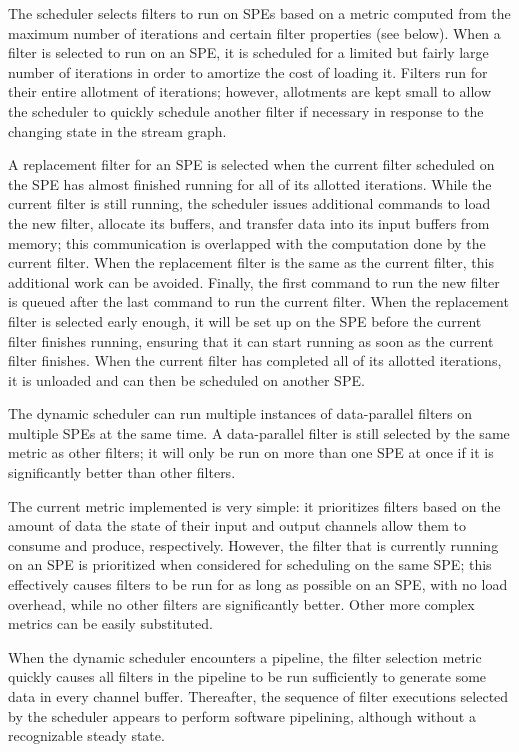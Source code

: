 The scheduler selects filters to run on SPEs based on a metric
computed from the maximum number of iterations and certain filter
properties (see below). When a filter is selected to run on an SPE, it
is scheduled for a limited but fairly large number of iterations in
order to amortize the cost of loading it. Filters run for their entire
allotment of iterations; however, allotments are kept small to allow
the scheduler to quickly schedule another filter if necessary in
response to the changing state in the stream graph.

A replacement filter for an SPE is selected when the current filter
scheduled on the SPE has almost finished running for all of its
allotted iterations. While the current filter is still running, the
scheduler issues additional commands to load the new filter, allocate
its buffers, and transfer data into its input buffers from memory;
this communication is overlapped with the computation done by the
current filter. When the replacement filter is the same as the current
filter, this additional work can be avoided. Finally, the first
command to run the new filter is queued after the last command to run
the current filter. When the replacement filter is selected early
enough, it will be set up on the SPE before the current filter
finishes running, ensuring that it can start running as soon as the
current filter finishes. When the current filter has completed all of
its allotted iterations, it is unloaded and can then be scheduled on
another SPE.

The dynamic scheduler can run multiple instances of data-parallel
filters on multiple SPEs at the same time. A data-parallel filter is
still selected by the same metric as other filters; it will only be
run on more than one SPE at once if it is significantly better than
other filters.

The current metric implemented is very simple: it prioritizes filters
based on the amount of data the state of their input and output
channels allow them to consume and produce, respectively. However, the
filter that is currently running on an SPE is prioritized when
considered for scheduling on the same SPE; this effectively causes
filters to be run for as long as possible on an SPE, with no load
overhead, while no other filters are significantly better. Other more
complex metrics can be easily substituted.

When the dynamic scheduler encounters a pipeline, the filter selection
metric quickly causes all filters in the pipeline to be run
sufficiently to generate some data in every channel
buffer. Thereafter, the sequence of filter executions selected by the
scheduler appears to perform software pipelining, although without a
recognizable steady state.
